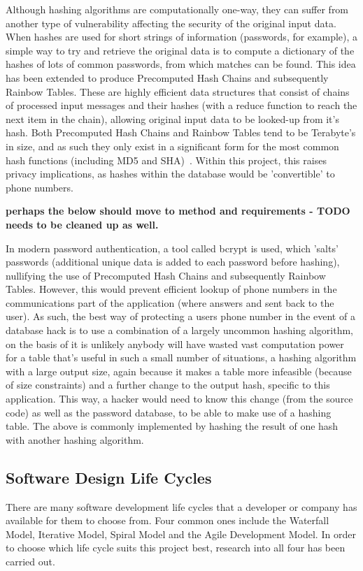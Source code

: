 \documentclass{article}
\begin{document}
Although hashing algorithms are computationally one-way, they can suffer from another type of vulnerability affecting the security of the original input data.  When hashes are used for short strings of information (passwords, for example), a simple way to try and retrieve the original data is to compute a dictionary of the hashes of lots of common passwords, from which matches can be found.  This idea has been extended to produce Precomputed Hash Chains and subsequently Rainbow Tables.  These are highly efficient data structures that consist of chains of processed input messages and their hashes (with a reduce function to reach the next item in the chain), allowing original input data to be looked-up from it's hash.  Both Precomputed Hash Chains and Rainbow Tables tend to be Terabyte's in size, and as such they only exist in a significant form for the most common hash functions (including MD5 and SHA)~\cite{Teat:2011:SCH:2016039.2016072}.  Within this project, this raises privacy implications, as hashes within the database would be 'convertible' to phone numbers.  

{\bf perhaps the below should move to method and requirements - TODO needs to be cleaned up as well.}

In modern password authentication, a tool called bcrypt is used, which 'salts' passwords (additional unique data is added to each password before hashing), nullifying the use of Precomputed Hash Chains and subsequently Rainbow Tables.  However, this would prevent efficient lookup of phone numbers in the communications part of the application (where answers and sent back to the user).  As such, the best way of protecting a users phone number in the event of a database hack is to use a combination of a largely uncommon hashing algorithm, on the basis of it is unlikely anybody will have wasted vast computation power for a table that's useful in such a small number of situations, a hashing algorithm with a large output size, again because it makes a table more infeasible (because of size constraints) and a further change to the output hash, specific to this application.  This way, a hacker would need to know this change (from the source code) as well as the password database, to be able to make use of a hashing table.  The above is commonly implemented by hashing the result of one hash with another hashing algorithm.

\subsection{Software Design Life Cycles}
There are many software development life cycles that a developer or company has available for them to choose from.  Four common ones include the Waterfall Model, Iterative Model, Spiral Model and the Agile Development Model.  In order to choose which life cycle suits this project best, research into all four has been carried out.
\end{document}
